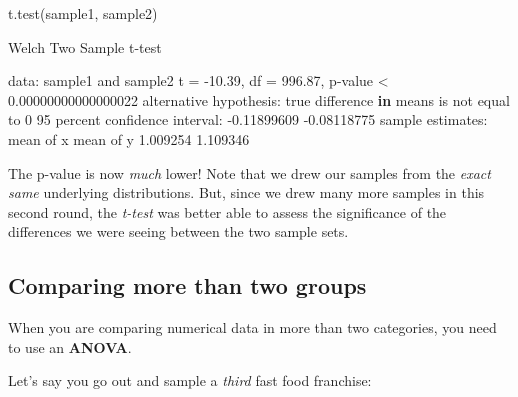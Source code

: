 \documentclass[
]{book}
\newenvironment{Shaded}{\begin{snugshade}}{\end{snugshade}}
\newcommand{\ControlFlowTok}[1]{\textcolor[rgb]{0.13,0.29,0.53}{\textbf{#1}}}
\newcommand{\DecValTok}[1]{\textcolor[rgb]{0.00,0.00,0.81}{#1}}
\newcommand{\FloatTok}[1]{\textcolor[rgb]{0.00,0.00,0.81}{#1}}
\newcommand{\FunctionTok}[1]{\textcolor[rgb]{0.00,0.00,0.00}{#1}}
\newcommand{\NormalTok}[1]{#1}
\newcommand{\OtherTok}[1]{\textcolor[rgb]{0.56,0.35,0.01}{#1}}
\newcommand{\SpecialCharTok}[1]{\textcolor[rgb]{0.00,0.00,0.00}{#1}}
\begin{document}
\begin{Shaded}
\begin{Highlighting}[]
\FunctionTok{t.test}\NormalTok{(sample1, }
\NormalTok{       sample2)}

\NormalTok{    Welch Two Sample t}\SpecialCharTok{{-}}\NormalTok{test}

\NormalTok{data}\SpecialCharTok{:}\NormalTok{  sample1 and sample2}
\NormalTok{t }\OtherTok{=} \SpecialCharTok{{-}}\FloatTok{10.39}\NormalTok{, df }\OtherTok{=} \FloatTok{996.87}\NormalTok{, p}\SpecialCharTok{{-}}\NormalTok{value }\SpecialCharTok{\textless{}} \FloatTok{0.00000000000000022}
\NormalTok{alternative hypothesis}\SpecialCharTok{:}\NormalTok{ true difference }\ControlFlowTok{in}\NormalTok{ means is not equal to }\DecValTok{0}
\DecValTok{95}\NormalTok{ percent confidence interval}\SpecialCharTok{:}
 \SpecialCharTok{{-}}\FloatTok{0.11899609} \SpecialCharTok{{-}}\FloatTok{0.08118775}
\NormalTok{sample estimates}\SpecialCharTok{:}
\NormalTok{mean of x mean of y }
 \FloatTok{1.009254}  \FloatTok{1.109346} 
\end{Highlighting}
\end{Shaded}

The p-value is now \emph{much} lower! Note that we drew our samples from the \emph{exact same} underlying distributions. But, since we drew many more samples in this second round, the \emph{t-test} was better able to assess the significance of the differences we were seeing between the two sample sets.

\hypertarget{comparing-more-than-two-groups}{%
\subsection*{Comparing more than two groups}\label{comparing-more-than-two-groups}}

When you are comparing numerical data in more than two categories, you need to use an \textbf{ANOVA}.

Let's say you go out and sample a \emph{third} fast food franchise:
\end{document}
